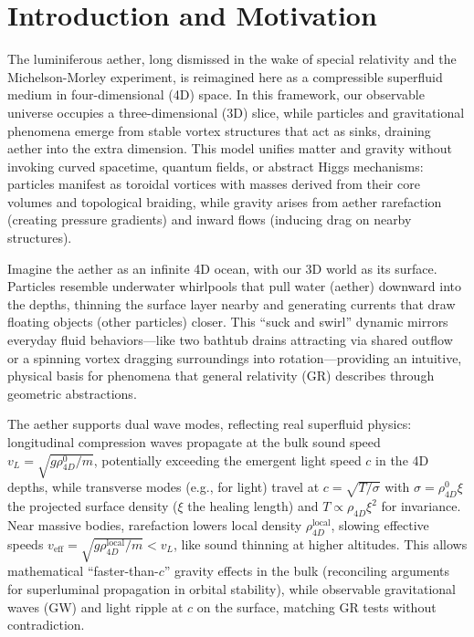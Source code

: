 \documentclass{article}
\begin{document}
\section{Introduction and Motivation}

The luminiferous aether, long dismissed in the wake of special relativity and the Michelson-Morley experiment, is reimagined here as a compressible superfluid medium in four-dimensional (4D) space. In this framework, our observable universe occupies a three-dimensional (3D) slice, while particles and gravitational phenomena emerge from stable vortex structures that act as sinks, draining aether into the extra dimension. This model unifies matter and gravity without invoking curved spacetime, quantum fields, or abstract Higgs mechanisms: particles manifest as toroidal vortices with masses derived from their core volumes and topological braiding, while gravity arises from aether rarefaction (creating pressure gradients) and inward flows (inducing drag on nearby structures).

Imagine the aether as an infinite 4D ocean, with our 3D world as its surface. Particles resemble underwater whirlpools that pull water (aether) downward into the depths, thinning the surface layer nearby and generating currents that draw floating objects (other particles) closer. This ``suck and swirl'' dynamic mirrors everyday fluid behaviors---like two bathtub drains attracting via shared outflow or a spinning vortex dragging surroundings into rotation---providing an intuitive, physical basis for phenomena that general relativity (GR) describes through geometric abstractions.

The aether supports dual wave modes, reflecting real superfluid physics: longitudinal compression waves propagate at the bulk sound speed $v_L = \sqrt{g \rho_{4D}^0 / m}$, potentially exceeding the emergent light speed $c$ in the 4D depths, while transverse modes (e.g., for light) travel at $c = \sqrt{T / \sigma}$ with $\sigma = \rho_{4D}^0 \xi$ the projected surface density ($\xi$ the healing length) and $T \propto \rho_{4D} \xi^2$ for invariance. Near massive bodies, rarefaction lowers local density $\rho_{4D}^{\text{local}}$, slowing effective speeds $v_{\text{eff}} = \sqrt{g \rho_{4D}^{\text{local}} / m} < v_L$, like sound thinning at higher altitudes. This allows mathematical ``faster-than-$c$'' gravity effects in the bulk (reconciling arguments for superluminal propagation in orbital stability), while observable gravitational waves (GW) and light ripple at $c$ on the surface, matching GR tests without contradiction.
\end{document}
